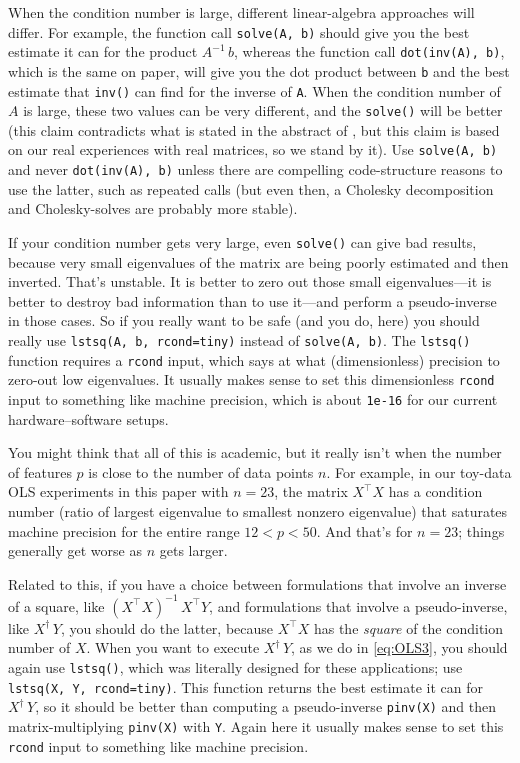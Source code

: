 \documentclass[12pt,letterpaper]{article}
\newcommand{\code}[1]{\texttt{#1}}
\begin{document}
When the condition number is large, different linear-algebra approaches will differ.
For example, the function call \code{solve(A, b)} should give you the best estimate it can for the product $A^{-1}\,b$, whereas the function call \code{dot(inv(A), b)}, which is the same on paper, will give you the dot product between \code{b} and the best estimate that \code{inv()} can find for the inverse of \code{A}.
When the condition number of $A$ is large, these two values can be very different, and the \code{solve()} will be better (this claim contradicts what is stated in the abstract of \citealt{solve}, but this claim is based on our real experiences with real matrices, so we stand by it).
Use \code{solve(A, b)} and never \code{dot(inv(A), b)} unless there are compelling code-structure reasons to use the latter, such as repeated calls (but even then, a Cholesky decomposition and Cholesky-solves are probably more stable).

If your condition number gets very large, even \code{solve()} can give bad results, because very small eigenvalues of the matrix are being poorly estimated and then inverted.
That's unstable.
It is better to zero out those small eigenvalues---it is better to destroy bad information than to use it---and perform a pseudo-inverse in those cases.
So if you really want to be safe (and you do, here) you should really use \code{lstsq(A, b, rcond=tiny)} instead of \code{solve(A, b)}.
The \code{lstsq()} function requires a \code{rcond} input, which says at what (dimensionless) precision to zero-out low eigenvalues.
It usually makes sense to set this dimensionless \code{rcond} input to something like machine precision, which is about \code{1e-16} for our current hardware--software setups.

You might think that all of this is academic, but it really isn't when the number of features $p$ is close to the number of data points $n$.
For example, in our toy-data OLS experiments in this paper with $n=23$, the matrix $X^\top X$ has a condition number (ratio of largest eigenvalue to smallest nonzero eigenvalue) that saturates machine precision for the entire range $12 < p < 50$.
And that's for $n=23$; things generally get worse as $n$ gets larger.

Related to this, if you have a choice between formulations that involve an inverse of a square, like $(X^\top X)^{-1}\,X^\top Y$, and formulations that involve a pseudo-inverse, like $X^\dagger\,Y$, you should do the latter, because $X^\top X$ has the \emph{square} of the condition number of $X$.
When you want to execute $X^\dagger\,Y$, as we do in \eqref{eq:OLS3}, you should again use \code{lstsq()}, which was literally designed for these applications; use \code{lstsq(X, Y, rcond=tiny)}.
This function returns the best estimate it can for $X^\dagger\,Y$, so
it should be better than computing a pseudo-inverse \code{pinv(X)} and then matrix-multiplying \code{pinv(X)} with \code{Y}.
Again here it usually makes sense to set this \code{rcond} input to something like machine precision.
\end{document}
